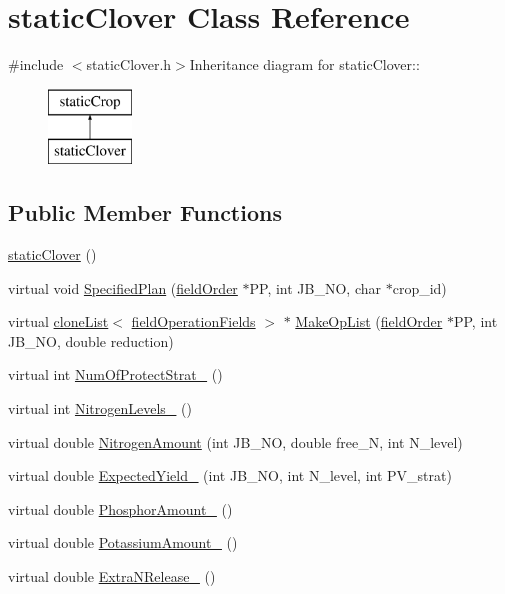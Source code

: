 \hypertarget{classstatic_clover}{
\section{staticClover Class Reference}
\label{classstatic_clover}
}


{\ttfamily \#include $<$staticClover.h$>$}Inheritance diagram for staticClover::\begin{figure}[H]
\begin{center}
\leavevmode
\includegraphics[height=2cm]{classstatic_clover}
\end{center}
\end{figure}
\subsection*{Public Member Functions}
\begin{DoxyCompactItemize}
\item 
\hyperlink{classstatic_clover_a9a2742cef7a336e4a3aa3d7975007761}{staticClover} ()
\item 
virtual void \hyperlink{classstatic_clover_a947279b029c4cbd26ba1e11efbefe0fc}{SpecifiedPlan} (\hyperlink{classfield_order}{fieldOrder} $\ast$PP, int JB\_\-NO, char $\ast$crop\_\-id)
\item 
virtual \hyperlink{classclone_list}{cloneList}$<$ \hyperlink{classfield_operation_fields}{fieldOperationFields} $>$ $\ast$ \hyperlink{classstatic_clover_aaa25687193bfade734dd6f0aff3df02c}{MakeOpList} (\hyperlink{classfield_order}{fieldOrder} $\ast$PP, int JB\_\-NO, double reduction)
\item 
virtual int \hyperlink{classstatic_clover_a23f68f39a4766a3cb79ef780545f7fc2}{NumOfProtectStrat\_\-} ()
\item 
virtual int \hyperlink{classstatic_clover_a50bfb95def66e3d974d8096e64851a94}{NitrogenLevels\_\-} ()
\item 
virtual double \hyperlink{classstatic_clover_ae9dc15ee27633df963bc99fe8f3a0ec9}{NitrogenAmount} (int JB\_\-NO, double free\_\-N, int N\_\-level)
\item 
virtual double \hyperlink{classstatic_clover_ad1701ce4c0fa8f637da0443beb1d1dfe}{ExpectedYield\_\-} (int JB\_\-NO, int N\_\-level, int PV\_\-strat)
\item 
virtual double \hyperlink{classstatic_clover_ac88cfc779dbd01681bc3f5a86195a8fe}{PhosphorAmount\_\-} ()
\item 
virtual double \hyperlink{classstatic_clover_acda5feff98054d16c5a29d5c283ae14d}{PotassiumAmount\_\-} ()
\item 
virtual double \hyperlink{classstatic_clover_af756e8a21b3a7b13335c64dac64b321a}{ExtraNRelease\_\-} ()
\end{DoxyCompactItemize}


